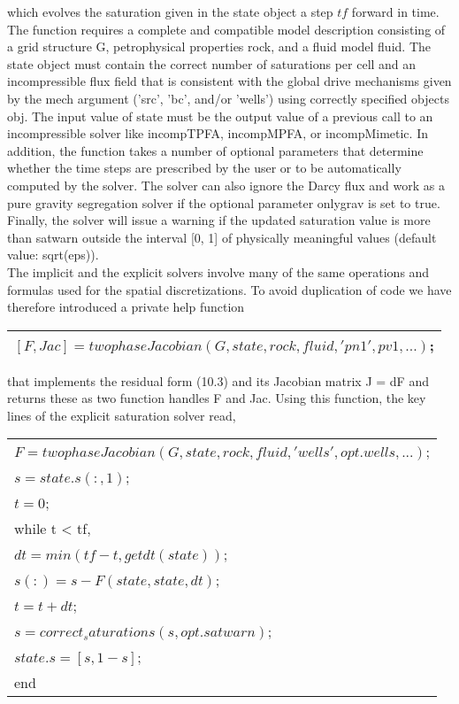 \documentclass[a4paper,10pt]{report}
\begin{document}
which evolves the saturation given in the state object a step $tf$ forward
in time. The function requires a complete and compatible model description
consisting of a grid structure G, petrophysical properties rock, and a fluid
model fluid. The state object must contain
the correct number of saturations per cell and an incompressible flux field that
is consistent with the global drive mechanisms given by the mech argument
(’src’, ’bc’, and/or ’wells’) using correctly specified objects obj. The input value of state
must be the output value of a previous call to an incompressible solver like
incompTPFA, incompMPFA, or incompMimetic. In addition, the function takes
a number of optional parameters that determine whether the time steps are
prescribed by the user or to be automatically computed by the solver. The
solver can also ignore the Darcy flux and work as a pure gravity segregation
solver if the optional parameter onlygrav is set to true. Finally, the solver will
issue a warning if the updated saturation value is more than satwarn outside
the interval [0, 1] of physically meaningful values (default value: sqrt(eps)).\\
The implicit and the explicit solvers involve many of the same operations
and formulas used for the spatial discretizations. To avoid duplication of code
we have therefore introduced a private help function
\begin{table}[!ht]
\centering
\begin{tabular}{ |l |} 
\hline
$[F,Jac] = twophaseJacobian(G, state, rock, fluid, 'pn1', pv1, ...)$;\\
 \hline
\end{tabular}
\label{table:twophaseJacobian}
\end{table} 
that implements the residual form (10.3) and its Jacobian matrix J = dF and
returns these as two function handles F and Jac. Using this function, the key
lines of the explicit saturation solver read,
\begin{table}[!ht]
\centering
\begin{tabular}{ |l |} 
\hline
$F = twophaseJacobian(G, state, rock, fluid, 'wells', opt.wells, ... )$;\\
$s = state.s(:,1)$;\\
$t = 0$;\\
while t < tf,\\
\hspace{0.5cm}$dt = min(tf−t, getdt(state))$;\\
\hspace{0.5cm}$s (:) = s − F(state, state, dt)$;\\
\hspace{0.5cm}$t = t + dt$;\\
\hspace{0.5cm} $s= correct_saturations(s, opt.satwarn)$;\\
\hspace{0.5cm}$state.s = [s, 1−s]$;\\
end\\
 \hline
\end{tabular}
\label{table:etransp}
\end{table} 
\end{document}
